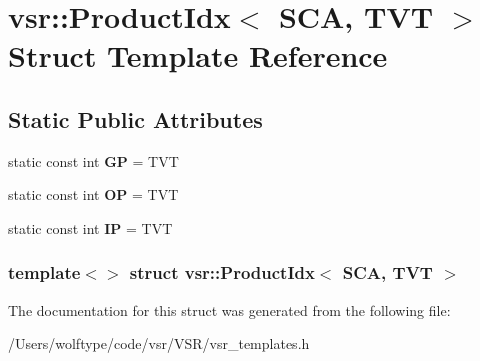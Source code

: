 \hypertarget{structvsr_1_1_product_idx_3_01_s_c_a_00_01_t_v_t_01_4}{\section{vsr\-:\-:Product\-Idx$<$ S\-C\-A, T\-V\-T $>$ Struct Template Reference}
\label{structvsr_1_1_product_idx_3_01_s_c_a_00_01_t_v_t_01_4}
}
\subsection*{Static Public Attributes}
\begin{DoxyCompactItemize}
\item 
\hypertarget{structvsr_1_1_product_idx_3_01_s_c_a_00_01_t_v_t_01_4_ae2516c25a0a57feb190e9e9af4a1105a}{static const int {\bfseries G\-P} = T\-V\-T}\label{structvsr_1_1_product_idx_3_01_s_c_a_00_01_t_v_t_01_4_ae2516c25a0a57feb190e9e9af4a1105a}

\item 
\hypertarget{structvsr_1_1_product_idx_3_01_s_c_a_00_01_t_v_t_01_4_a3730c3c476e6971c0d697b40ac795cfe}{static const int {\bfseries O\-P} = T\-V\-T}\label{structvsr_1_1_product_idx_3_01_s_c_a_00_01_t_v_t_01_4_a3730c3c476e6971c0d697b40ac795cfe}

\item 
\hypertarget{structvsr_1_1_product_idx_3_01_s_c_a_00_01_t_v_t_01_4_aa4df0fdc04312500e66a00e36e45714b}{static const int {\bfseries I\-P} = T\-V\-T}\label{structvsr_1_1_product_idx_3_01_s_c_a_00_01_t_v_t_01_4_aa4df0fdc04312500e66a00e36e45714b}

\end{DoxyCompactItemize}
\subsubsection*{template$<$$>$ struct vsr\-::\-Product\-Idx$<$ S\-C\-A, T\-V\-T $>$}



The documentation for this struct was generated from the following file\-:\begin{DoxyCompactItemize}
\item 
/\-Users/wolftype/code/vsr/\-V\-S\-R/vsr\-\_\-templates.\-h\end{DoxyCompactItemize}
